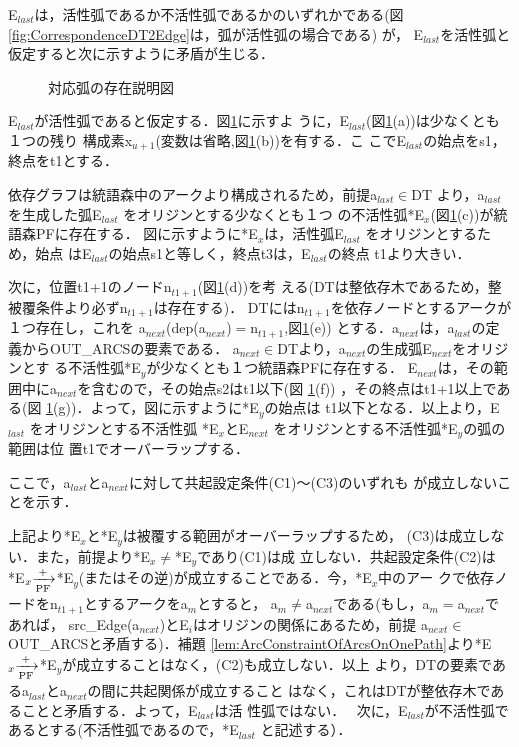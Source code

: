 \begin{lemma}[対応弧の存在]
{E$_{last}$は，活性弧であるか不活性弧であるかのいずれかである(図
\ref{fig:CorrespondenceDT2Edge}は，弧が活性弧の場合である) が，
E$_{last}$を活性弧と仮定すると次に示すように矛盾が生じる．

\begin{figure}[b]
 \begin{center}
 \end{center}
\myfiglabelskip
\caption{対応弧の存在説明図}
\label{fig:ActiveEdgeLast}
\end{figure}

E$_{last}$が活性弧であると仮定する．図\ref{fig:ActiveEdgeLast}に示すよ
うに，E$_{last}$(図\ref{fig:ActiveEdgeLast}(a))は少なくとも１つの残り
構成素x$_{u+1}$(変数は省略,図\ref{fig:ActiveEdgeLast}(b))を有する．こ
こでE$_{last}$の始点をs1，終点をt1とする．

依存グラフは統語森中のアークより構成されるため，前提a$_{last}{\in}$DT 
より，a$_{last}$を生成した弧E$_{last}$ をオリジンとする少なくとも１つ
の不活性弧*E$_{x}$(図\ref{fig:ActiveEdgeLast}(c))が統語森PFに存在する．
図に示すように*E$_{x}$は，活性弧E$_{last}$ をオリジンとするため，始点
はE$_{last}$の始点s1と等しく，終点t3は，E$_{last}$の終点
t1より大きい．

次に，位置t1+1のノードn$_{t1+1}$(図\ref{fig:ActiveEdgeLast}(d))を考
える(DTは整依存木であるため，整被覆条件より必ずn$_{t1+1}$は存在する)．
DTにはn$_{t1+1}$を依存ノードとするアークが１つ存在し，これを
a$_{next}$(dep(a$_{next}$)$=$n$_{t1+1}$,図\ref{fig:ActiveEdgeLast}(e)) 
とする．a$_{next}$は，a$_{last}$の定義からOUT\_ARCSの要素である．
a$_{next}{\in}$DTより，a$_{next}$の生成弧E$_{next}$をオリジンとす
る不活性弧*E$_{y}$が少なくとも１つ統語森PFに存在する．
E$_{next}$は，その範囲中にa$_{next}$を含むので，その始点s2はt1以下(図
\ref{fig:ActiveEdgeLast}(f)) ，その終点はt1+1以上である(図
\ref{fig:ActiveEdgeLast}(g))．よって，図に示すように*E$_{y}$の始点は
t1以下となる．以上より，E$_{last}$ をオリジンとする不活性弧
*E$_{x}$とE$_{next}$ をオリジンとする不活性弧*E$_{y}$の弧の範囲は位
置t1でオーバーラップする．

ここで，a$_{last}$とa$_{next}$に対して共起設定条件(C1)〜(C3)のいずれも
が成立しないことを示す．

上記より*E$_{x}$と*E$_{y}$は被覆する範囲がオーバーラップするため，
(C3)は成立しない．また，前提より*E$_{x}{\neq}$*E$_{y}$であり(C1)は成
立しない．共起設定条件(C2)は*E$_{x}{\xrightarrow[{\rm PF}]{{\tiny
+}}}$*E$_{y}$(またはその逆)が成立することである．今，*E$_x$中のアー
クで依存ノードをn$_{t1+1}$とするアークをa$_m$とすると，
a$_m{\neq}$a$_{next}$である(もし，a$_m=$a$_{next}$であれば，
src\_Edge(a$_{next}$)とE$_i$はオリジンの関係にあるため，前提
a$_{next}{\in}$OUT\_ARCSと矛盾する)．補題
\ref{lem:ArcConstraintOfArcsOnOnePath}より*E$_{x}{\xrightarrow[{\rm
PF}]{{\tiny +}}}$*E$_{y}$が成立することはなく，(C2)も成立しない．以上
より，DTの要素であるa$_{last}$とa$_{next}$の間に共起関係が成立すること
はなく，これはDTが整依存木であることと矛盾する．よって，E$_{last}$は活
性弧ではない．　
\mygapskip
次に，E$_{last}$が不活性弧であるとする(不活性弧であるので，*E$_{last}$
と記述する）．

}
\end{lemma}
